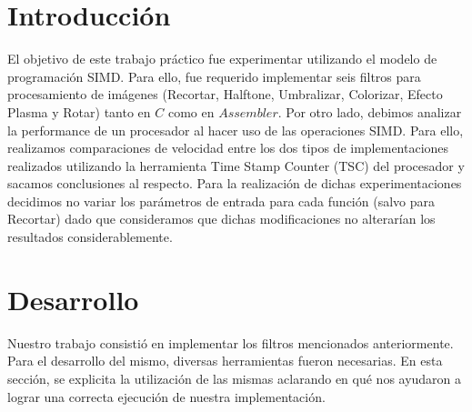 \documentclass[10pt, a4paper]{article}
\begin{document}
\section{Introducci\'on}
El objetivo de este trabajo pr\'actico fue experimentar utilizando el modelo de programaci\'on SIMD. Para ello, fue requerido implementar seis filtros para procesamiento de im\'agenes (Recortar, Halftone, Umbralizar, Colorizar, Efecto Plasma y Rotar) tanto en $C$ como en $Assembler$.\newline
Por otro lado, debimos analizar la performance de un procesador al hacer uso de las operaciones SIMD. Para ello, realizamos comparaciones de velocidad entre los dos tipos de implementaciones realizados utilizando la herramienta Time Stamp Counter (TSC) del procesador y sacamos conclusiones al respecto. Para la realización de dichas experimentaciones decidimos no variar los parámetros de entrada para cada función (salvo para Recortar) dado que consideramos que dichas modificaciones no alterarían los resultados considerablemente.

\section{Desarrollo}
Nuestro trabajo consistió en implementar los filtros mencionados anteriormente. Para el desarrollo del mismo, diversas herramientas fueron necesarias. En esta sección, se explicita la utilización de las mismas aclarando en qué nos ayudaron a lograr una correcta ejecución de nuestra implementación.  
\end{document}
